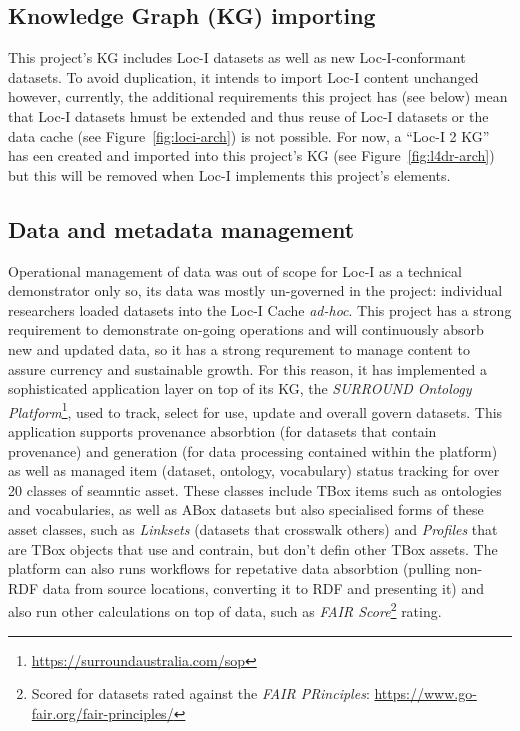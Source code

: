 \documentclass[runningheads]{llncs}
\begin{document}
\subsection{Knowledge Graph (KG) importing}
This project's KG includes Loc-I datasets as well as new Loc-I-conformant datasets. To avoid duplication, it intends to import Loc-I content unchanged however, 
currently, the additional requirements this project has (see below) mean that Loc-I datasets hmust be extended and thus reuse of Loc-I datasets
or the data cache (see Figure~\ref{fig:loci-arch}) is not possible. For now, a ``Loc-I 2 KG'' has een created and imported into this project's KG (see 
Figure~\ref{fig:l4dr-arch}) but this will be removed when Loc-I implements this project's elements.

\subsection{Data and metadata management}
Operational management of data was out of scope for Loc-I as a technical demonstrator only so, its data was mostly un-governed in the project: individual researchers loaded datasets into the Loc-I Cache \textit{ad-hoc}. This project has a strong requirement to demonstrate on-going operations and will continuously 
absorb new and updated data, so it has a strong requrement to manage content to assure currency and sustainable growth. For this reason, it has implemented a sophisticated application layer on top of its KG, the 
\textit{SURROUND Ontology Platform}\footnote{\url{https://surroundaustralia.com/sop}}, used to track, select for use, update and overall govern datasets. This application
supports provenance absorbtion (for datasets that contain provenance) and generation (for data processing contained within the platform) as well as managed item (dataset, ontology, vocabulary)
status tracking for over 20 classes of seamntic asset. These classes include TBox items such as ontologies and vocabularies, as well as ABox datasets but also specialised forms of these asset classes, such as \textit{Linksets} (datasets that crosswalk others) and \textit{Profiles} that are TBox objects that use and contrain, but don't defin other TBox assets. 
The platform can also runs workflows for repetative data absorbtion (pulling non-RDF data from source locations, converting it to RDF and presenting it) and also run other calculations on top of data, such as \textit{FAIR Score}\footnote{Scored for datasets rated against the \textit{FAIR PRinciples}: \url{https://www.go-fair.org/fair-principles/}} rating. 
\end{document}
